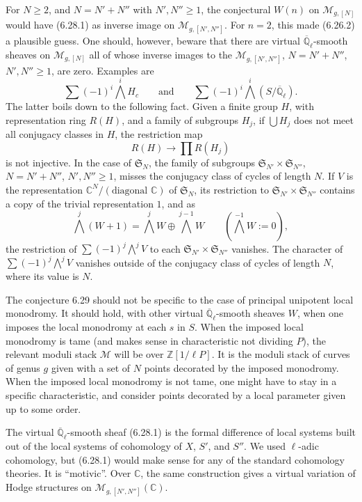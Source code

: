 \documentclass[10pt]{article}
\newcommand{\Ql}{\overline{\mathbb Q}_{\ell}}
\newcommand{\C}{\mathbb C}
\newcommand{\Z}{\mathbb Z}
\theoremstyle{deligne}
\newcommand{\heading}[1]{\vspace{0.7em}\noindent{\bfseries #1}\quad}
\begin{document}
For $N\ge2$, and $N=N'+N''$ with $N',N''\ge1$, the conjectural $W(n)$ on $\mathcal M_{g,[N]}$ would have (6.28.1) as inverse image on $\mathcal M_{g,[N',N'']}$. For $n=2$, this made (6.26.2) a plausible guess. One should, however, beware that there are virtual $\Ql$-smooth sheaves on $\mathcal M_{g,[N]}$ all of whose inverse images to the $\mathcal M_{g,[N',N'']}$, $N=N'+N''$, $N',N''\ge1$, are zero. Examples are
\[
\sum(-1)^i\bigwedge^iH_c\qquad\text{and}\qquad \sum(-1)^i\bigwedge^i(S/\Ql).
\]
The latter boils down to the following fact. Given a finite group $H$, with representation ring $R(H)$, and a family of subgroups $H_j$, if $\bigcup H_j$ does not meet all conjugacy classes in $H$, the restriction map
\[
R(H)\longrightarrow\prod R(H_j)
\]
is not injective. In the case of $\mathfrak S_N$, the family of subgroups $\mathfrak S_{N'}\times\mathfrak S_{N''}$, $N=N'+N''$, $N',N''\ge1$, misses the conjugacy class of cycles of length $N$. If $V$ is the representation $\C^N/(\text{diagonal }\C)$ of $\mathfrak S_N$, its restriction to $\mathfrak S_{N'}\times\mathfrak S_{N''}$ contains a copy of the trivial representation $1$, and as
\[
\bigwedge^j(W+1)=\bigwedge^jW\oplus\bigwedge^{j-1}W\qquad(\bigwedge^{-1}W:=0),
\]
the restriction of $\sum(-1)^j\bigwedge^jV$ to each $\mathfrak S_{N'}\times\mathfrak S_{N''}$ vanishes. The character of $\sum(-1)^j\bigwedge^jV$ vanishes outside of the conjugacy class of cycles of length $N$, where its value is $N$.

\heading{6.30.} The conjecture 6.29 should not be specific to the case of principal unipotent local monodromy. It should hold, with other virtual $\Ql$-smooth sheaves $W$, when one imposes the local monodromy at each $s$ in $S$. When the imposed local monodromy is tame (and makes sense in characteristic not dividing $P$), the relevant moduli stack $\mathcal M$ will be over $\Z[1/\ell P]$. It is the moduli stack of curves of genus $g$ given with a set of $N$ points decorated by the imposed monodromy. When the imposed local monodromy is not tame, one might have to stay in a specific characteristic, and consider points decorated by a local parameter given up to some order.

\heading{Question 6.31.} The virtual $\Ql$-smooth sheaf (6.28.1) is the formal difference of local systems built out of the local systems of cohomology of $X$, $S'$, and $S''$. We used $\ell$-adic cohomology, but (6.28.1) would make sense for any of the standard cohomology theories. It is ``motivic''. Over $\C$, the same construction gives a virtual variation of Hodge structures on $\mathcal M_{g,[N',N'']}(\C)$.
\end{document}
